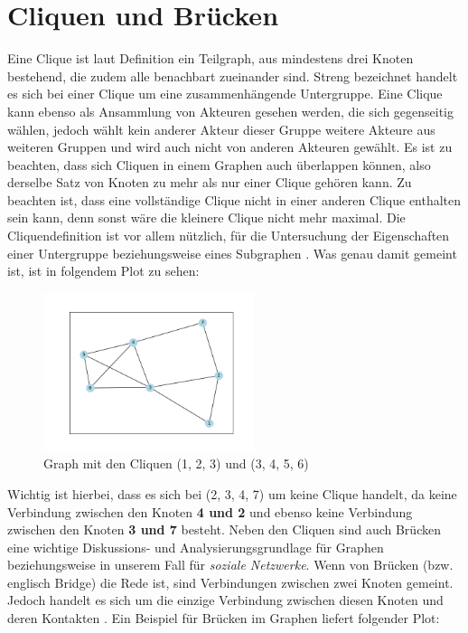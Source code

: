 \section{Cliquen und Brücken}
\label{ch:CliquenBrücken}
Eine Clique ist laut Definition ein Teilgraph, aus mindestens drei Knoten bestehend, die zudem alle benachbart zueinander sind. Streng bezeichnet handelt es sich bei einer Clique um eine zusammenhängende Untergruppe. Eine Clique kann ebenso als Ansammlung von Akteuren gesehen werden, die sich gegenseitig wählen, jedoch wählt kein anderer Akteur dieser Gruppe weitere Akteure aus weiteren Gruppen und wird auch nicht von anderen Akteuren gewählt. Es ist zu beachten, dass sich Cliquen in einem Graphen auch überlappen können, also derselbe Satz von Knoten zu mehr als nur einer Clique gehören kann. Zu beachten ist, dass eine vollständige Clique nicht in einer anderen Clique enthalten sein kann, denn sonst wäre die kleinere Clique nicht mehr maximal. Die Cliquendefinition ist vor allem nützlich, für die Untersuchung der Eigenschaften einer Untergruppe beziehungsweise eines Subgraphen \cite{wasserman1994social}. Was genau damit gemeint ist, ist in folgendem Plot zu sehen: 
\FloatBarrier
\begin{figure}[htb!]
    \centering
    \includegraphics[width=0.55\textwidth]{Graphics/Clique.png}
    \caption{Graph mit den Cliquen (1, 2, 3) und (3, 4, 5, 6)}
    \label{fig:Clique}
\end{figure}

\newpage
Wichtig ist hierbei, dass es sich bei (2, 3, 4, 7) um keine Clique handelt, da keine Verbindung zwischen den Knoten \textbf{4 und 2} und ebenso keine Verbindung zwischen den Knoten \textbf{3 und 7} besteht.
Neben den Cliquen sind auch Brücken eine wichtige Diskussions- und Analysierungsgrundlage für Graphen beziehungsweise in unserem Fall für \textit{soziale Netzwerke}. Wenn von Brücken (bzw. englisch Bridge) die Rede ist, sind Verbindungen zwischen zwei Knoten gemeint. Jedoch handelt es sich um die einzige Verbindung zwischen diesen Knoten und deren Kontakten \cite{bridge}. Ein Beispiel für Brücken im Graphen liefert folgender Plot:

